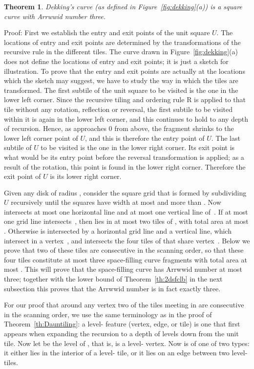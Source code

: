 \documentclass[11pt,a4paper]{article}
\newcommand{\unittile}{\ensuremath{U}\xspace}
\newtheorem{theorem}{Theorem}
\newenvironment{proof}{Proof:}{\qed}
\def\squareforqed{\hbox{\rlap{}}}
\def\qed{\ifmmode\squareforqed\else{\unskip\nobreak\hfil
\penalty50\hskip1em\null\nobreak\hfil\squareforqed
\parfillskip=0pt\finalhyphendemerits=0\endgraf}\fi}
\begin{document}
\begin{theorem}\label{th:dekking}
Dekking's curve (as defined in Figure~\ref{fig:dekking}(a)) is a square curve with Arrwwid number three.
\end{theorem}
\begin{proof}
First we establish the entry and exit points of the unit square \unittile. The locations of entry and exit points are determined by the transformations of the recursive rule in the different tiles. The curve drawn in Figure~\ref{fig:dekking}(a) does not define the locations of entry and exit points; it is just a sketch for illustration. To prove that the entry and exit points are actually at the locations which the sketch may suggest, we have to study the way in which the tiles are transformed. The first subtile of the unit square to be visited is the one in the lower left corner. Since the recursive tiling and ordering rule \textsf{R} is applied to that tile without any rotation, reflection or reversal, the first subtile to be visited within it is again in the lower left corner, and this continues to hold to any depth of recursion. Hence, as  approaches 0 from above, the fragment  shrinks to the lower left corner point of \unittile, and this is therefore the entry point of \unittile. The last subtile of \unittile to be visited is the one in the lower right corner. Its exit point is what would be its entry point before the reversal transformation is applied; as a result of the rotation, this point is found in the lower right corner. Therefore the exit point of \unittile is its lower right corner.

Given any disk  of radius , consider the square grid  that is formed by subdividing \unittile recursively until the squares have width at most  and more than . Now  intersects at most one horizontal line and at most one vertical line of~. If at most one grid line intersects~, then  lies in at most two tiles of , with total area at most . Otherwise  is intersected by a horizontal grid line and a vertical line, which intersect in a vertex~, and  intersects the four tiles of  that share vertex~. Below we prove that two of these tiles are consecutive in the scanning order, so that these four tiles constitute at most three space-filling curve fragments with total area at most . This will prove that the space-filling curve has Arrwwid number at most three; together with the lower bound of Theorem~\ref{th:2dsfclb} in the next subsection this proves that the Arrwwid number is in fact exactly three.

For our proof that around any vertex  two of the tiles meeting in  are consecutive in the scanning order, we use the same terminology as in the proof of Theorem~\ref{th:Dauntiling}: a level- feature (vertex, edge, or tile) is one that first appears when expanding the recursion to a depth of  levels down from the unit tile. Now let  be the level of , that is,  is a level- vertex. Now  is of one of two types: it either lies in the interior of a level- tile, or it lies on an edge between two level- tiles.


\end{proof}
\end{document}
